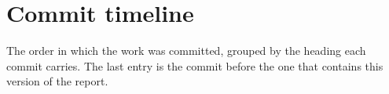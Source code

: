 \chapter{Commit timeline}
\label{app:timeline}
The order in which the work was committed, grouped by the heading each commit carries. The last entry is the commit before the one that contains this version of the report.

